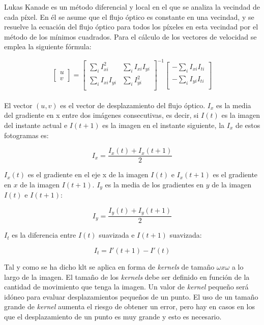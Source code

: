 Lukas Kanade es un método diferencial y local en el que se analiza la vecindad de cada píxel. En él se asume que el flujo óptico es constante en una vecindad, y se resuelve la ecuación del flujo óptico para todos los píxeles en esta vecindad por el método de los mínimos cuadrados. Para el cálculo de los vectores de velocidad se emplea la siguiente fórmula:

\begin{equation}\label{klt_formula}
   \begin{bmatrix}u \\ v\end{bmatrix} = \begin{bmatrix}
            \sum_{i}I_{xi}^2 & \sum_{i}I_{xi}I_{yi} \\
            \sum_{i}I_{xi}I_{yi} &  \sum_{i}I_{yi}^2 \\
\end{bmatrix}^{-1} \begin{bmatrix}
-\sum_{i}I_{xi}I_{ti} \\
-\sum_{i}I_{yi}I_{ti} \\
\end{bmatrix}
\end{equation}
\\

El vector $(u,v)$ es el vector de desplazamiento del flujo óptico.
$I_x$ es la media del gradiente en x entre dos imágenes consecutivas, es decir, si $I(t)$ es la imagen del instante actual e $I(t+1)$ es la imagen en el instante siguiente, la $I_x$ de estos fotogramas es:

\begin{equation}
    I_x = \frac{I_x(t)+I_x(t+1)}{2}
\end{equation}

$I_x(t)$ es el gradiente en el eje x de la imagen $I(t)$ e $I_x(t+1)$ es el gradiente en $x$ de la imagen $I(t+1)$. $I_y$ es la media de los gradientes en $y$ de la imagen $I(t)$ e $I(t+1)$:

\begin{equation}
    I_y = \frac{I_y(t)+I_y(t+1)}{2}
\end{equation}

$I_t$ es la diferencia entre $I(t)$ suavizada e $I(t+1)$ suavizada:

\begin{equation}
   I_t = I'(t+1) - I'(t) 
\end{equation}

Tal y como se ha dicho \acrshort{klt} se aplica en forma de \textit{kernels} de tamaño $\omega x \omega$ a lo largo de la imagen. El tamaño de los \textit{kernels} debe ser definido en función de la cantidad de movimiento que tenga la imagen. Un valor de \textit{kernel} pequeño será idóneo para evaluar desplazamientos pequeños de un punto. El uso de un tamaño grande de \textit{kernel} aumenta el riesgo de obtener un error, pero hay en casos en los que el desplazamiento de un punto es muy grande y esto es necesario.

